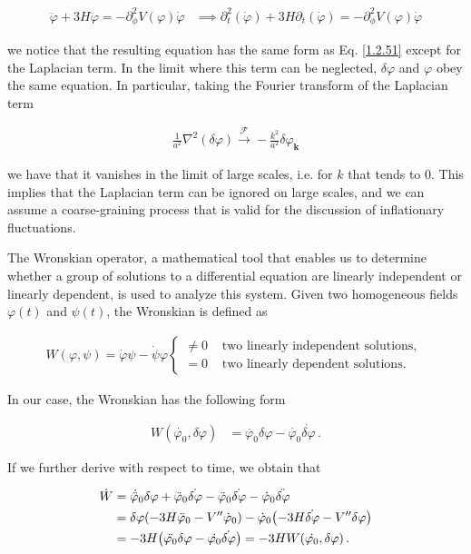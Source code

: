 \begin{align}
    \dddot{\varphi} + 3H\ddot{\varphi} = -\partial_{\phi}^2 V(\varphi)\dot{\varphi} &\implies \partial_{t}^2 {(\dot{\varphi})} + 3H\partial_{t}{(\dot{\varphi})} = - \partial_{\phi}^2 V(\varphi)\dot{\varphi}\label{1.2.128}
\end{align}

we notice that the resulting equation has the same form as Eq. \eqref{1.2.51} except for the Laplacian term. In the limit where this term can be neglected, $\delta \varphi$ and $\varphi$ obey the same equation. In particular, taking the Fourier transform of the Laplacian term

\begin{align}
    \frac{1}{a^{2}} \nabla^{2}(\delta \varphi) \stackrel{\mathcal{F}}{\rightarrow}-\frac{k^{2}}{a^{2}} \delta \varphi_{\mathbf{k}}\label{1.2.129}
\end{align}

we have that it vanishes in the limit of large scales, i.e. for $k$ that tends to 0. This implies that the Laplacian term can be ignored on large scales, and we can assume a coarse-graining process that is valid for the discussion of inflationary fluctuations.

The Wronskian operator, a mathematical tool that enables us to determine whether a group of solutions to a differential equation are linearly independent or linearly dependent, is used to analyze this system. Given two homogeneous fields $\varphi(t)$ and $\psi(t)$, the Wronskian is defined as

\begin{align}
    W(\varphi, \psi)=\dot{\varphi} \psi-\dot{\psi} \varphi \begin{cases}\neq 0 & \text { two linearly independent solutions, } \\ =0 & \text { two linearly dependent solutions. }\end{cases} \label{1.2.130}
\end{align}

In our case, the Wronskian has the following form

\begin{align}
   W(\dot{\varphi_0}, \delta \varphi ) &= \ddot{\varphi_0} \delta \varphi - \dot{\varphi_0} \dot{ \delta \varphi}\,.\label{1.2.131}
\end{align}

If we further derive with respect to time, we obtain that


\begin{align}
    \dot{W} &= \dot{\ddot{\varphi}}_0 \delta \varphi + \ddot{\varphi}_0 \dot{ \delta \varphi} - \ddot{\varphi}_0 \dot{\delta \varphi } - \dot{\varphi}_0 \ddot{\delta \varphi }  \\
    &= \delta \varphi \qty(- 3H \ddot{\varphi}_0 - V'' \dot{\varphi}_0 ) - \dot{\varphi}_0 \qty(- 3H \dot{\delta \varphi } - V'' \delta \varphi )  \\
    &= - 3H \qty(\ddot{\varphi_0} \delta \varphi - \dot{\varphi_0} \dot{ \delta \varphi}) = -3HW(\dot{\varphi_0}, \delta \varphi )\label{1.2.134}
    \,.
\end{align}

